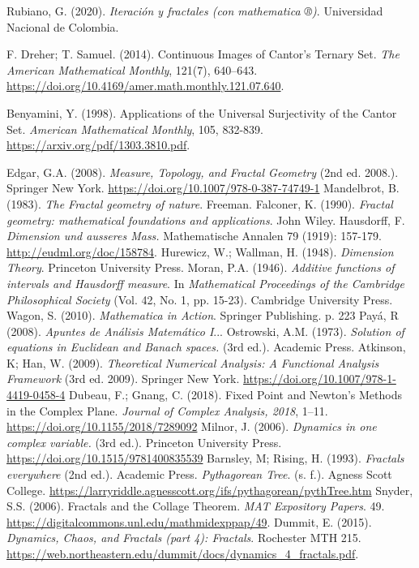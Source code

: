 \begin{thebibliography}{99}
    
 Rubiano, G. (2020). \textit{Iteración y fractales (con mathematica ®)}. Universidad Nacional de Colombia.

 F. Dreher; T. Samuel. (2014). Continuous Images of Cantor’s Ternary Set. \textit{The American Mathematical Monthly}, 121(7), 640–643. \url{https://doi.org/10.4169/amer.math.monthly.121.07.640}.

 Benyamini, Y. (1998). Applications of the Universal Surjectivity of the Cantor Set. \textit{American Mathematical Monthly}, 105, 832-839. \url{https://arxiv.org/pdf/1303.3810.pdf}.

 Edgar, G.A. (2008). \textit{Measure, Topology, and Fractal Geometry} (2nd ed. 2008.). Springer New York. \url{https://doi.org/10.1007/978-0-387-74749-1}
 Mandelbrot, B. (1983). \textit{The Fractal geometry of nature}. Freeman.
 Falconer, K. (1990). \textit{Fractal geometry: mathematical foundations and applications}. John Wiley.
 Hausdorff, F. \textit{Dimension und ausseres Mass.} Mathematische Annalen 79 (1919): 157-179. \url{http://eudml.org/doc/158784}.
Hurewicz, W.; Wallman, H. (1948). \textit{Dimension Theory}. Princeton University Press.
Moran, P.A. (1946). \textit{Additive functions of intervals and Hausdorff measure}. In \textit{Mathematical Proceedings of the Cambridge Philosophical Society} (Vol. 42, No. 1, pp. 15-23). Cambridge University Press.
Wagon, S. (2010). \textit{Mathematica in Action}. Springer Publishing. p. 223
 Payá, R (2008). \textit{Apuntes de Análisis Matemático I}...
 Ostrowski, A.M. (1973). \textit{Solution of equations in Euclidean and Banach spaces.} (3rd ed.). Academic Press.
 Atkinson, K; Han, W. (2009). \textit{Theoretical Numerical Analysis: A Functional Analysis Framework} (3rd ed. 2009). Springer New York. \url{https://doi.org/10.1007/978-1-4419-0458-4}
 Dubeau, F.; Gnang, C. (2018). Fixed Point and Newton’s Methods in the Complex Plane. \textit{Journal of Complex Analysis, 2018}, 1–11. \url{https://doi.org/10.1155/2018/7289092}
 Milnor, J. (2006). \textit{Dynamics in one complex variable.} (3rd ed.). Princeton University Press. \url{https://doi.org/10.1515/9781400835539}
 Barnsley, M; Rising, H. (1993). \textit{Fractals everywhere} (2nd ed.). Academic Press.
 \textit{Pythagorean Tree}. (s. f.). Agness Scott College. \url{https://larryriddle.agnesscott.org/ifs/pythagorean/pythTree.htm}
 Snyder, S.S. (2006). Fractals and the Collage Theorem. \textit{MAT Expository Papers}. 49. \url{https://digitalcommons.unl.edu/mathmidexppap/49}.
 Dummit, E. (2015). \textit{Dynamics, Chaos, and Fractals (part 4): Fractals}. Rochester MTH 215. \url{https://web.northeastern.edu/dummit/docs/dynamics_4_fractals.pdf}.


\end{thebibliography}
